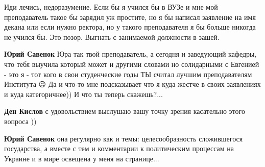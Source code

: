 \begin{itemize}

Иди лечись, недоразумение. Если бы я учился бы в ВУЗе и мне мой преподаватель
такое бы зарядил уж простите, но я бы написал заявление на имя декана или если
нужно ректора, но у такого преподавателя я бы больше никогда не учился бы. Это
позор. Выгнать с занимаемой должности в зашей.

\begin{itemize}

\textbf{Юрий Савенок} Юра так твой преподаватель, а сегодня и заведующий кафедры, что тебя выучила который может и другими словами но солидарными с Евгенией - это я - тот кого в свои студенческие годы ТЫ считал лучшим преподавателям Института 😉 Да и что-то мне подсказывает что я куда жестче в своих заявлениях и куда категоричнее)) И что ты теперь скажешь?...


\textbf{Ден Кислов} с удовольствием выслушаю вашу точку зрения касательно этого вопроса ))


\textbf{Юрий Савенок} она регулярно как и темы: целесообразность сложившегося государства, а вместе с тем и комментарии к политическим процессам на Украине и в мире освещена у меня на странице...
\end{itemize}

\end{itemize}

